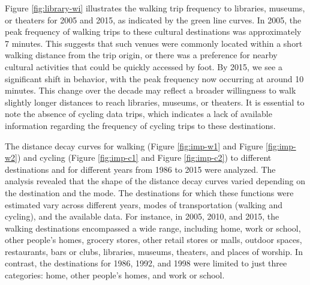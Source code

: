 \documentclass[12pt,twoside]{reedthesis}
\begin{document}
Figure \ref{fig:library-wi} illustrates the walking trip frequency to libraries, museums, or theaters for 2005 and 2015, as indicated by the green line curves. In 2005, the peak frequency of walking trips to these cultural destinations was approximately 7 minutes. This suggests that such venues were commonly located within a short walking distance from the trip origin, or there was a preference for nearby cultural activities that could be quickly accessed by foot. By 2015, we see a significant shift in behavior, with the peak frequency now occurring at around 10 minutes. This change over the decade may reflect a broader willingness to walk slightly longer distances to reach libraries, museums, or theaters. It is essential to note the absence of cycling data trips, which indicates a lack of available information regarding the frequency of cycling trips to these destinations.

The distance decay curves for walking (Figure \ref{fig:imp-w1} and Figure \ref{fig:imp-w2}) and cycling (Figure \ref{fig:imp-c1} and Figure \ref{fig:imp-c2}) to different destinations and for different years from 1986 to 2015 were analyzed. The analysis revealed that the shape of the distance decay curves varied depending on the destination and the mode. The destinations for which these functions were estimated vary across different years, modes of transportation (walking and cycling), and the available data. For instance, in 2005, 2010, and 2015, the walking destinations encompassed a wide range, including home, work or school, other people's homes, grocery stores, other retail stores or malls, outdoor spaces, restaurants, bars or clubs, libraries, museums, theaters, and places of worship. In contrast, the destinations for 1986, 1992, and 1998 were limited to just three categories: home, other people's homes, and work or school.
\end{document}
